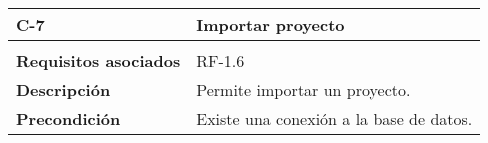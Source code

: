 \begin{longtable}[H]{@{}ll@{}}
\toprule
\begin{minipage}[b]{0.23\columnwidth}\raggedright\strut
\textbf{C-7}\strut
\end{minipage} & \begin{minipage}[b]{0.71\columnwidth}\raggedright\strut
\textbf{Importar proyecto}\strut
\end{minipage}\tabularnewline
\midrule
\endhead
\tabularnewline
\begin{minipage}[t]{0.23\columnwidth}\raggedright\strut
\textbf{Requisitos asociados}\strut
\end{minipage} & \begin{minipage}[t]{0.71\columnwidth}\raggedright\strut
RF-1.6\strut
\end{minipage}\tabularnewline
\begin{minipage}[t]{0.23\columnwidth}\raggedright\strut
\textbf{Descripción}\strut
\end{minipage} & \begin{minipage}[t]{0.71\columnwidth}\raggedright\strut
Permite importar un proyecto.\strut
\end{minipage}\tabularnewline
\begin{minipage}[t]{0.23\columnwidth}\raggedright\strut
\textbf{Precondición}\strut
\end{minipage} & \begin{minipage}[t]{0.71\columnwidth}\raggedright\strut
Existe una conexión a la base de datos.


\end{minipage}
\end{longtable}
